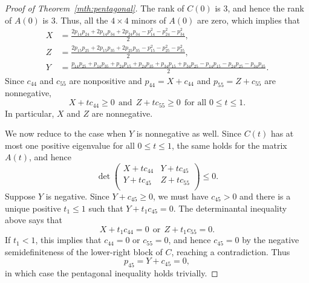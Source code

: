 \documentclass{amsart}
\theoremstyle{definition}
\theoremstyle{remark}
\begin{document}
\begin{proof}[Proof of Theorem~\ref{mth:pentagonal}]
The rank of $C(0)$ is $3$, and hence the rank of $A(0)$ is $3$. Thus, all the $4\times 4$ minors of $A(0)$ are zero, which implies that 
\begin{align*}
    X&=\frac{2p_{14}p_{24}+2p_{14}p_{34}+2p_{24}p_{34}-p_{14}^2-p_{24}^2-p_{34}^2}{2},\\
    Z&=\frac{2p_{15}p_{25}+2p_{15}p_{35}+2p_{25}p_{35}-p_{15}^2-p_{25}^2-p_{35}^2}{2}, \\
Y&=\frac{p_{14}p_{25}+p_{14}p_{35}+p_{24}p_{15}+p_{24}p_{35}+p_{34}p_{15}+p_{34}p_{25}-p_{14}p_{15}-p_{24}p_{25}-p_{34}p_{35}}{2}.
\end{align*}
Since $c_{44}$ and $c_{55}$ are nonpositive and $p_{44}=X+c_{44}$ and  $p_{55}=Z+c_{55}$ are nonnegative, 
\[
X+tc_{44} \ge 0 \ \ \text{and} \ \ Z+tc_{55} \ge 0 \ \ \text{for all $0 \le t \le 1$.}
\]
In particular, $X$ and $Z$ are nonnegative.

We now reduce to the case when $Y$ is nonnegative as well.
Since $C(t)$ has at most one positive eigenvalue for all $0 \le t \le 1$,  the same holds for the matrix $A(t)$, and hence
\[
\det \begin{pmatrix}
X+tc_{44} & Y+tc_{45} \\
 Y+tc_{45} & Z+tc_{55} \\    
\end{pmatrix} \le 0.
\]
Suppose $Y$ is negative. Since $Y+c_{45} \ge 0$, we must have $c_{45}>0$ and there is a unique positive $t_1 \le 1$ such that $Y+t_1c_{45}=0$. The determinantal inequality above says that 
\[
X+t_1c_{44}=0  \ \ \text{or} \ \  Z+t_1c_{55}=0.
\]
If $t_1<1$, this implies that $c_{44}=0$ or $c_{55}=0$, and hence $c_{45}=0$ by the negative semidefiniteness of the lower-right block of $C$, reaching a contradiction.
Thus 
\[
p_{45}=Y+c_{45}=0,
\]
in which case the pentagonal inequality holds trivially.


\end{proof}
\end{document}

